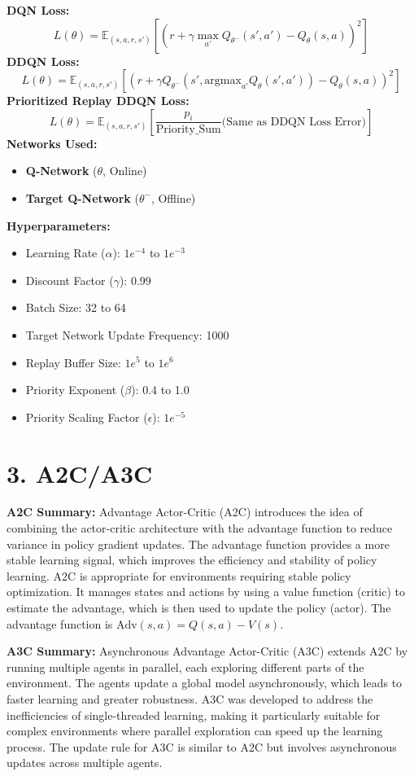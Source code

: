 \documentclass[a4paper,10pt]{article}
\begin{document}
\begin{multicols}{2}
\textbf{DQN Loss:}
\[
L(\theta) = \mathbb{E}_{(s, a, r, s')} \left[ \left( r + \gamma \max_{a'} Q_{\theta^-}(s', a') - Q_\theta(s, a) \right)^2 \right]
\]
\textbf{DDQN Loss:}
\[
L(\theta) = \mathbb{E}_{(s, a, r, s')} \left[ \left( r + \gamma Q_{\theta^-}(s', \text{argmax}_{a'} Q_\theta(s', a')) - Q_\theta(s, a) \right)^2 \right]
\]
\textbf{Prioritized Replay DDQN Loss:}
\[
L(\theta) = \mathbb{E}_{(s, a, r, s')} \left[ \frac{p_i}{\text{Priority\_Sum}} \text{(Same as DDQN Loss Error)} \right]
\]
\textbf{Networks Used:} 
\begin{itemize}
    \item \textbf{Q-Network} (\(\theta\), Online)
    \item \textbf{Target Q-Network} (\(\theta^-\), Offline)
\end{itemize}
\textbf{Hyperparameters:}
\begin{itemize}
    \item Learning Rate (\(\alpha\)): \(1e^{-4}\) to \(1e^{-3}\)
    \item Discount Factor (\(\gamma\)): 0.99
    \item Batch Size: 32 to 64
    \item Target Network Update Frequency: 1000
    \item Replay Buffer Size: \(1e^5\) to \(1e^6\)
    \item Priority Exponent (\(\beta\)): 0.4 to 1.0
    \item Priority Scaling Factor (\(\epsilon\)): \(1e^{-5}\)
\end{itemize}

\section*{3. A2C/A3C}
\textbf{A2C Summary:} Advantage Actor-Critic (A2C) introduces the idea of combining the actor-critic architecture with the advantage function to reduce variance in policy gradient updates. The advantage function provides a more stable learning signal, which improves the efficiency and stability of policy learning. A2C is appropriate for environments requiring stable policy optimization. It manages states and actions by using a value function (critic) to estimate the advantage, which is then used to update the policy (actor). The advantage function is \( \text{Adv}(s, a) = Q(s, a) - V(s) \).

\textbf{A3C Summary:} Asynchronous Advantage Actor-Critic (A3C) extends A2C by running multiple agents in parallel, each exploring different parts of the environment. The agents update a global model asynchronously, which leads to faster learning and greater robustness. A3C was developed to address the inefficiencies of single-threaded learning, making it particularly suitable for complex environments where parallel exploration can speed up the learning process. The update rule for A3C is similar to A2C but involves asynchronous updates across multiple agents.


\end{multicols}
\end{document}
